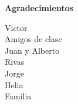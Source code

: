 \newpage{}
\thispagestyle{plain}
\begin{center}
    \Large
    \vspace{0.9cm}
    \textbf{Agradecimientos}
\end{center}

Victor\\



Amigos de clase\\

Juan y Alberto\\

Rivas\\

Jorge\\

Helia\\

Familia\\
